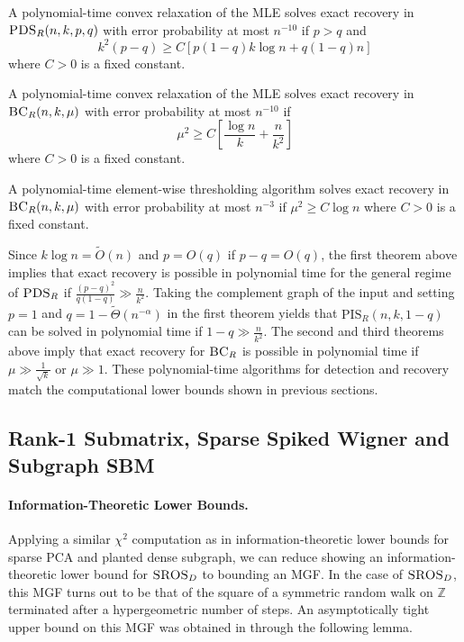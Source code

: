 \begin{theorem}
A polynomial-time convex relaxation of the MLE solves exact recovery in $\textsc{PDS}_R(n, k, p, q)$ with error probability at most $n^{-10}$ if $p > q$ and
$$k^2(p - q) \ge C\left[ p(1 - q) k \log n + q(1 - q) n \right]$$
where $C > 0$ is a fixed constant.
\end{theorem}

\begin{theorem}
A polynomial-time convex relaxation of the MLE solves exact recovery in $\textsc{BC}_R(n, k, \mu)$ with error probability at most $n^{-10}$ if
$$\mu^2 \ge C\left[ \frac{\log n}{k} + \frac{n}{k^2} \right]$$
where $C > 0$ is a fixed constant.
\end{theorem}

\begin{theorem}
A polynomial-time element-wise thresholding algorithm solves exact recovery in $\textsc{BC}_R(n, k, \mu)$ with error probability at most $n^{-3}$ if $\mu^2 \ge C \log n$ where $C > 0$ is a fixed constant.
\end{theorem}

Since $k \log n = \tilde{O}(n)$ and $p = O(q)$ if $p - q = O(q)$, the first theorem above implies that exact recovery is possible in polynomial time for the general regime of $\textsc{PDS}_R$ if $\frac{(p - q)^2}{q(1 - q)} \gg \frac{n}{k^2}$. Taking the complement graph of the input and setting $p = 1$ and $q = 1 - \tilde{\Theta}(n^{-\alpha})$ in the first theorem yields that $\text{PIS}_R(n, k, 1 - q)$ can be solved in polynomial time if $1 - q \gg \frac{n}{k^2}$. The second and third theorems above imply that exact recovery for $\textsc{BC}_R$ is possible in polynomial time if $\mu \gg \frac{1}{\sqrt{k}}$ or $\mu \gg 1$. These polynomial-time algorithms for detection and recovery match the computational lower bounds shown in previous sections.

\subsection{Rank-1 Submatrix, Sparse Spiked Wigner and Subgraph SBM}

\paragraph{Information-Theoretic Lower Bounds.} Applying a similar $\chi^2$ computation as in information-theoretic lower bounds for sparse PCA and planted dense subgraph, we can reduce showing an information-theoretic lower bound for $\textsc{SROS}_D$ to bounding an MGF. In the case of $\textsc{SROS}_D$, this MGF turns out to be that of the square of a symmetric random walk on $\mathbb{Z}$ terminated after a hypergeometric number of steps. An asymptotically tight upper bound on this MGF was obtained in \cite{cai2015optimal} through the following lemma.

